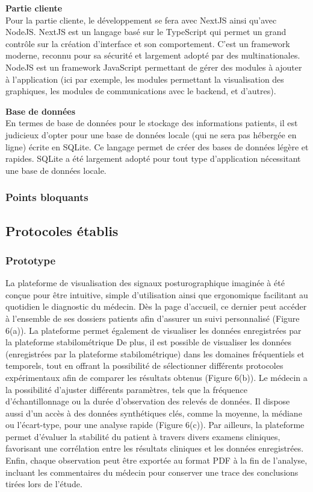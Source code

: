 \textbf{Partie cliente} \\
Pour la partie cliente, le développement se fera avec NextJS ainsi qu'avec NodeJS.
NextJS est un langage basé sur le TypeScript qui permet un grand contrôle sur la création d'interface et son comportement.
C'est un framework moderne, reconnu pour sa sécurité et largement adopté par des multinationales.
NodeJS est un framework JavaScript permettant de gérer des modules à ajouter à l'application (ici par exemple, les modules permettant la visualisation des graphiques, les modules de communications avec le backend, et d'autres).

\textbf{Base de données} \\
En termes de base de données pour le stockage des informations patients, il est judicieux d’opter pour une base de données locale (qui ne sera pas hébergée en ligne) écrite en SQLite.
Ce langage permet de créer des bases de données légère et rapides.
SQLite a été largement adopté pour tout type d’application nécessitant une base de données locale.

\subsubsection{Points bloquants}

\subsection{Protocoles établis}

\subsubsection{Prototype}
La plateforme de visualisation des signaux posturographique imaginée à été conçue 
pour être intuitive, simple d’utilisation ainsi que ergonomique facilitant au 
quotidien le diagnostic du médecin. Dès la page d’accueil, ce dernier peut accéder 
à l’ensemble de ses dossiers patients afin d’assurer un suivi personnalisé 
(Figure 6(a)). La plateforme permet également de visualiser les données 
enregistrées par la plateforme stabilométrique 
De plus, il est possible de visualiser les données 
(enregistrées par la plateforme stabilométrique) dans les domaines fréquentiels 
et temporels, tout en offrant la possibilité de sélectionner différents protocoles 
expérimentaux afin de comparer les résultats obtenus (Figure 6(b)). Le médecin a 
la possibilité d’ajuster différents paramètres, tels que la fréquence 
d’échantillonnage ou la durée d’observation des relevés de données.  Il dispose 
aussi d’un accès à des données synthétiques clés, comme la moyenne, la médiane ou 
l’écart-type, pour une analyse rapide (Figure 6(c)). Par ailleurs, la plateforme 
permet d’évaluer la stabilité du patient à travers divers examens cliniques, 
favorisant une corrélation entre les résultats cliniques et les données 
enregistrées. Enfin, chaque observation peut être exportée au format PDF à la fin 
de l’analyse, incluant les commentaires du médecin pour conserver une trace des 
conclusions tirées lors de l’étude.

